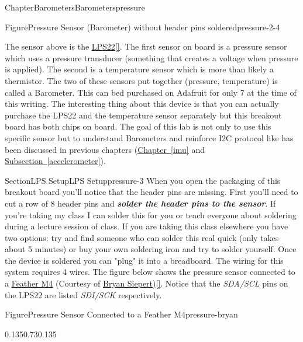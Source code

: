 \documentclass[oneside,10pt,]{book}
\newcommand{\xreffont}{\relax}
\newcommand{\linkhilite}[1]{\underline{#1}}
\newcommand{\alert}[1]{\textbf{\textit{#1}}}
\numberwithin{equation}{section}
\begin{document}
\begin{chapterptx}{Chapter}{Barometers}{}{Barometers}{}{}{pressure}
\begin{introduction}{}
\begin{figureptx}{Figure}{Pressure Sensor (Barometer) without header pins soldered}{pressure-2-4}{}
\tcblower
\end{figureptx}%
The sensor above is the \href{https://www.adafruit.com/product/4633}{\linkhilite{LPS22}}\hyperlink{AdafruitMAIN}{\linkhilite{[{\xreffont 34}]}}. The first sensor on board is a pressure sensor which uses a pressure transducer (something that creates a voltage when pressure is applied). The second is a temperature sensor which is more than likely a thermistor. The two of these sensors put together (pressure, temperature) is called a Barometer. This can bed purchased on Adafruit for only \textdollar{}7 at the time of this writing. The interesting thing about this device is that you can actually purchase the LPS22 and the temperature sensor separately but this breakout board has both chips on board. The goal of this lab is not only to use this specific sensor but to understand Barometers and reinforce I2C protocol like has been discussed in previous chapters (\hyperref[imu]{\linkhilite{Chapter~{\xreffont\ref{imu}}}} and \hyperref[accelerometer]{\linkhilite{Subsection~{\xreffont\ref{accelerometer}}}}).%
\end{introduction}%
%
%
\typeout{************************************************}
\typeout{************************************************}
%
\begin{sectionptx}{Section}{LPS Setup}{}{LPS Setup}{}{}{pressure-3}
When you open the packaging of this breakout board you'll notice that the header pins are missing. First you'll need to cut a row of 8 header pins and \alert{solder the header pins to the sensor}. If you're taking my class I can solder this for you or teach everyone about soldering during a lecture session of class. If you are taking this class elsewhere you have two options: try and find someone who can solder this real quick (only takes about 5 minutes) or buy your own soldering iron and try to solder yourself. Once the device is soldered you can "plug" it into a breadboard. The wiring for this system requires 4 wires. The figure below shows the pressure sensor connected to a \href{https://learn.adafruit.com/lis3mdl-triple-axis-magnetometer/python-circuitpython}{\linkhilite{Feather M4}} (Courtesy of \href{https://learn.adafruit.com/u/siddacious}{\linkhilite{Bryan Siepert}})\hyperlink{Adafruit}{\linkhilite{[{\xreffont 32}]}}. Notice that the \emph{SDA\slash{}SCL} pins on the LPS22 are listed \emph{SDI\slash{}SCK} respectively.%
\begin{figureptx}{Figure}{Pressure Sensor Connected to a Feather M4}{pressure-bryan}{}%
\begin{image}{0.135}{0.73}{0.135}{}%

\end{image}
\end{figureptx}
\end{sectionptx}
\end{chapterptx}
\end{document}
